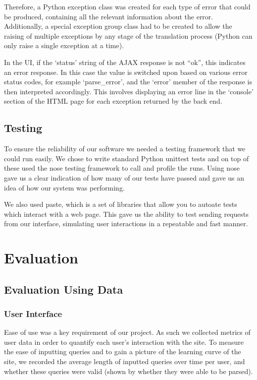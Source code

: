 \documentclass[a4paper, 11pt]{article}
\begin{document}
      Therefore, a Python exception class was created for each type of error
      that could be produced, containing all the relevant information about the
      error. Additionally, a special exception group class had to be created to
      allow the raising of multiple exceptions by any stage of the translation
      process (Python can only raise a single exception at a time).

      In the UI, if the `status' string of the AJAX response is not ``ok'', this
      indicates an error response. In this case the value is switched upon based
      on various error status codes, for example `parse\_error', and the `error'
      member of the response is then interpreted accordingly. This involves
      displaying an error line in the `console' section of the HTML page for
      each exception returned by the back end.

  \subsection{Testing}
  To ensure the reliability of our software we needed a testing framework that
  we could run easily. We chose to write standard Python unittest tests and on
  top of these used the nose testing framework to call and profile the runs.
  Using nose gave us a clear indication of how many of our tests have passed
  and gave us an idea of how our system was performing.

  We also used paste, which is a set of libraries that allow you to autoate
  tests which interact with a web page. This gave us the ability to test
  sending requests from our interface, simulating user interactions in a
  repeatable and fast manner.


\section{Evaluation}

  \subsection{Evaluation Using Data}
    \subsubsection{User Interface}
    Ease of use was a key requirement of our project. As such we collected
    metrics of user data in order to quantify each user's interaction with the
    site. To measure the ease of inputting queries and to gain a picture of the
    learning curve of the site, we recorded the average length of inputted
    queries over time per user, and whether these queries were valid (shown
    by whether they were able to be parsed).
\end{document}
